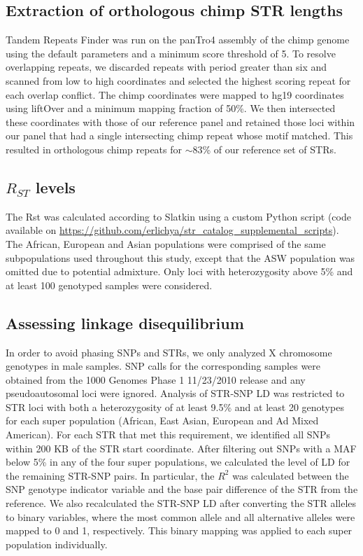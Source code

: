 \subsection{Extraction of orthologous chimp STR lengths}
Tandem Repeats Finder was run on the panTro4 assembly of the chimp genome using the default parameters and a minimum score threshold of 5. To resolve overlapping repeats, we discarded repeats with period greater than six and scanned from low to high coordinates and selected the highest scoring repeat for each overlap conflict. The chimp coordinates were mapped to hg19 coordinates using liftOver and a minimum mapping fraction of 50\%. We then intersected these coordinates with those of our reference panel and retained those loci within our panel that had a single intersecting chimp repeat whose motif matched. This resulted in orthologous chimp repeats for $\sim$83\% of our reference set of STRs.  

\subsection{$R_{ST}$ levels}
The Rst was calculated according to Slatkin \cite{Slatkin1995} using a custom Python script (code available on \url{https://github.com/erlichya/str_catalog_supplemental_scripts}). The African, European and Asian populations were comprised of the same subpopulations used throughout this study, except that the ASW population was omitted due to potential admixture. Only loci with heterozygosity above 5\% and at least 100 genotyped samples were considered. 

\subsection{Assessing linkage disequilibrium}
In order to avoid phasing SNPs and STRs, we only analyzed X chromosome genotypes in male samples. SNP calls for the corresponding samples were obtained from the 1000 Genomes Phase 1 11/23/2010 release and any pseudoautosomal loci were ignored. Analysis of STR-SNP LD was restricted to STR loci with both a heterozygosity of at least 9.5\% and at least 20 genotypes for each super population (African, East Asian, European and Ad Mixed American). For each STR that met this requirement, we identified all SNPs within 200 KB of the STR start coordinate. After filtering out SNPs with a MAF below 5\% in any of the four super populations, we calculated the level of LD for the remaining STR-SNP pairs. In particular, the $R^2$ was calculated between the SNP genotype indicator variable and the base pair difference of the STR from the reference. We also recalculated the STR-SNP LD after converting the STR alleles to binary variables, where the most common allele and all alternative alleles were mapped to 0 and 1, respectively. This binary mapping was applied to each super population individually. 

